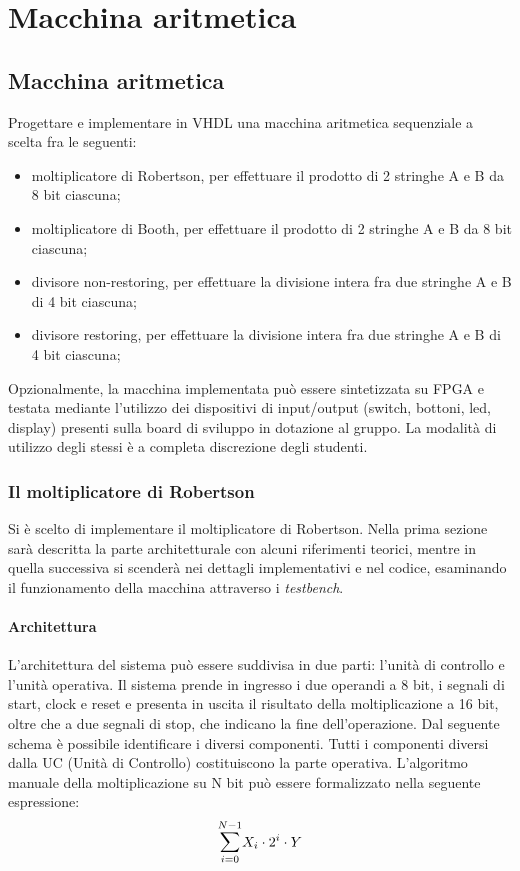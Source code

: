 \chapter{Macchina aritmetica}

\section{Macchina aritmetica}

Progettare e implementare in VHDL una macchina aritmetica sequenziale a scelta fra le seguenti: 
    \begin{itemize}
        \item moltiplicatore di Robertson, per effettuare il prodotto di 2 stringhe A e B da 8 bit ciascuna;
        \item moltiplicatore di Booth, per effettuare il prodotto di 2 stringhe A e B da 8 bit ciascuna;
        \item divisore non-restoring, per effettuare la divisione intera fra due stringhe A e B di 4 bit ciascuna;
        \item divisore restoring, per effettuare la divisione intera fra due stringhe A e B di 4 bit ciascuna;
    \end{itemize}

Opzionalmente, la macchina implementata può essere sintetizzata su FPGA e testata mediante l’utilizzo dei dispositivi di input/output (switch, bottoni, led, display) presenti sulla board di sviluppo in dotazione al gruppo. La modalità di utilizzo degli stessi è a completa discrezione degli studenti.


\subsection{Il moltiplicatore di Robertson}
Si è scelto di implementare il moltiplicatore di Robertson. Nella prima sezione sarà descritta la parte architetturale con alcuni riferimenti teorici, mentre in quella successiva si scenderà nei dettagli implementativi e nel codice, esaminando il funzionamento della macchina attraverso i \textit{testbench}.

\subsubsection{Architettura}
L'architettura del sistema può essere suddivisa in due parti: l'unità di controllo e l'unità operativa.
Il sistema prende in ingresso i due operandi a 8 bit, i segnali di start, clock e reset e presenta in uscita il risultato della moltiplicazione a 16 bit, oltre che a due segnali di stop, che indicano la fine dell'operazione.
Dal seguente schema è possibile identificare i diversi componenti. Tutti i componenti diversi dalla UC (Unità di Controllo) costituiscono la parte operativa.
L'algoritmo manuale della moltiplicazione su N bit può essere formalizzato nella seguente espressione:
\begin{equation*}
  \mathlarger{\sum}_{i=0}^{N-1}X_i\cdot2^i\cdot Y
      \label{eq:mul_alg}
\end{equation*}


